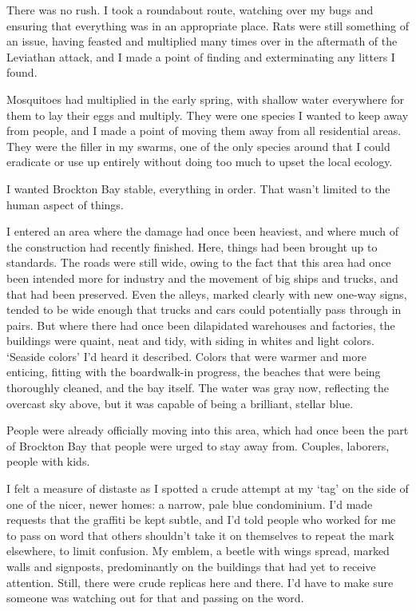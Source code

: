 There was no rush.  I took a roundabout route, watching over my bugs and ensuring that everything was in an appropriate place.  Rats were still something of an issue, having feasted and multiplied many times over in the aftermath of the Leviathan attack, and I made a point of finding and exterminating any litters I found.



Mosquitoes had multiplied in the early spring, with shallow water everywhere for them to lay their eggs and multiply.  They were one species I wanted to keep away from people, and I made a point of moving them away from all residential areas.  They were the filler in my swarms, one of the only species around that I could eradicate or use up entirely without doing too much to upset the local ecology.



I wanted Brockton Bay stable, everything in order.  That wasn't limited to the human aspect of things.



I entered an area where the damage had once been heaviest, and where much of the construction had recently finished.  Here, things had been brought up to standards.  The roads were still wide, owing to the fact that this area had once been intended more for industry and the movement of big ships and trucks, and that had been preserved.  Even the alleys, marked clearly with new one-way signs, tended to be wide enough that trucks and cars could potentially pass through in pairs.  But where there had once been dilapidated warehouses and factories, the buildings were quaint, neat and tidy, with siding in whites and light colors.  `Seaside colors' I'd heard it described.  Colors that were warmer and more enticing, fitting with the boardwalk-in progress, the beaches that were being thoroughly cleaned, and the bay itself.  The water was gray now, reflecting the overcast sky above, but it was capable of being a brilliant, stellar blue.



People were already officially moving into this area, which had once been the part of Brockton Bay that people were urged to stay away from.  Couples, laborers, people with kids.



I felt a measure of distaste as I spotted a crude attempt at my `tag' on the side of one of the nicer, newer homes: a narrow, pale blue condominium.  I'd made requests that the graffiti be kept subtle, and I'd told people who worked for me to pass on word that others shouldn't take it on themselves to repeat the mark elsewhere, to limit confusion.  My emblem, a beetle with wings spread, marked walls and signposts, predominantly on the buildings that had yet to receive attention.  Still, there were crude replicas here and there.  I'd have to make sure someone was watching out for that and passing on the word.



